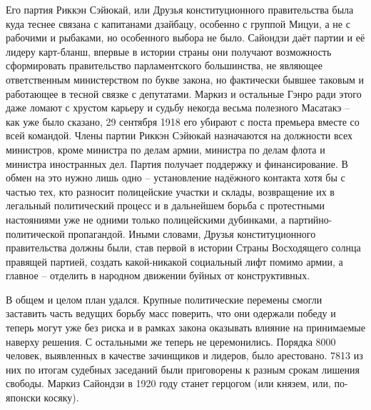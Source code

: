 Его партия Риккэн Сэйюкай, или Друзья конституционного правительства была куда теснее связана с капитанами дзайбацу, особенно с группой Мицуи, а не с рабочими и рыбаками, но особенного выбора не было. Сайондзи даёт партии и её лидеру карт-бланш, впервые в истории страны они получают возможность сформировать правительство парламентского большинства, не являющее ответственным министерством по букве закона, но фактически бывшее таковым и работающее в тесной связке с депутатами. Маркиз и остальные Гэнро ради этого даже ломают с хрустом карьеру и судьбу некогда весьма полезного Масатакэ – как уже было сказано, 29 сентября 1918 его убирают с поста премьера вместе со всей командой. Члены партии Риккэн Сэйюкай назначаются на должности всех министров, кроме министра по делам армии, министра по делам флота и министра иностранных дел. Партия получает поддержку и финансирование. В обмен на это нужно лишь одно – установление надёжного контакта хотя бы с частью тех, кто разносит полицейские участки и склады, возвращение их в легальный политический процесс и в дальнейшем борьба с протестными настояниями уже не одними только полицейскими дубинками, а партийно-политической пропагандой. Иными словами, Друзья конституционного правительства должны были, став первой в истории Страны Восходящего солнца правящей партией, создать какой-никакой социальный лифт помимо армии, а главное – отделить в народном движении буйных от конструктивных.

В общем и целом план удался. Крупные политические перемены смогли заставить часть ведущих борьбу масс поверить, что они одержали победу и теперь могут уже без риска и в рамках закона оказывать влияние на принимаемые наверху решения. С остальными же теперь не церемонились. Порядка 8000 человек, выявленных в качестве зачинщиков и лидеров, было арестовано. 7813 из них по итогам судебных заседаний были приговорены к разным срокам лишения свободы. Маркиз Сайондзи в 1920 году станет герцогом (или князем, или, по-японски косяку). 

